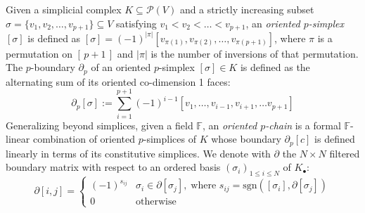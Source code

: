 \\
\\
Given a simplicial complex $K \subseteq \mathcal{P}(V)$ and a strictly increasing subset $\sigma = \{v_1, v_2, \dots, v_{p+1}\} \subseteq V$ satisfying $v_1 < v_2 < \dots < v_{p+1}$, an \emph{oriented $p$-simplex} $[\sigma]$ is defined as $[\sigma] = (-1)^{\lvert \pi \rvert } \left [v_{\pi(1)}, v_{\pi(2)}, \dots, v_{\pi(p+1)} \right ]$,
where $\pi$ is a permutation on $[\,p+1\,]$ and $\lvert \pi \rvert$ is the number of inversions of that permutation. The $p$-boundary $\partial_p$ of an oriented $p$-simplex $[\sigma] \in K$ is defined as the alternating sum of its oriented co-dimension 1 faces:
\begin{equation}\label{eq:alt_sum}
	\partial_p[\sigma] := \sum_{i=1}^{p+1} (-1)^{i-1} [v_1, \dots, v_{i-1}, v_{i+1}, \dots v_{p+1}]
\end{equation}
Generalizing beyond simplices, given a field $\mathbb{F}$, an \emph{oriented $p$-chain} is a formal $\mathbb{F}$-linear combination of oriented $p$-simplices of $K$ whose boundary $\partial_p[c]$ is defined linearly in terms of its constitutive simplices. 
We denote with $\partial$ the $N \times N$ filtered boundary matrix with respect to an ordered basis $(\sigma_i)_{1 \leq i \leq N}$ of $K_\bullet$:
\begin{equation}\label{eq:boundary_matrix}
	\partial[i,j] = \begin{cases}
		(-1)^{s_{ij}} & \sigma_i \in \partial[\sigma_j], \; \text{where } s_{ij} = \mathrm{sgn}([\sigma_i], \partial [\sigma_j])  \\
		0 & \text{otherwise}
	\end{cases}
\end{equation}
